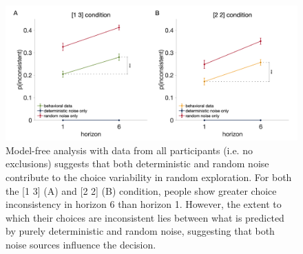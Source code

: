 \documentclass[12pt]{article}
\begin{document}
	\begin{figure}[H]
		\begin{center}
			\includegraphics[width=\textwidth]{figures/RanDetNoise_2noise_all.png}
			\caption{Model-free analysis with data from all participants (i.e. no exclusions) suggests that both deterministic and random noise contribute to the choice variability in random exploration. For both the [1 3] (A) and [2 2] (B) condition, people show greater choice inconsistency in horizon 6 than horizon 1. However, the extent to which their choices are inconsistent lies between what is predicted by purely deterministic and random noise, suggesting that both noise sources influence the decision.}
			\label{fig:mf22}
		\end{center}
	\end{figure}
	\newpage
\end{document}
